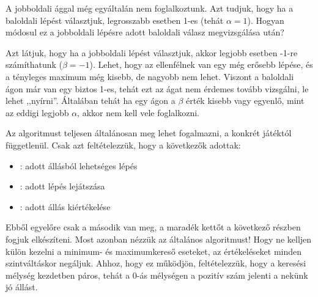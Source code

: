A jobboldali ággal még egyáltalán nem
foglalkoztunk. Azt tudjuk, hogy ha a baloldali
lépést választjuk, legrosszabb esetben 1-es (tehát
$\alpha=1$). Hogyan módosul ez a jobboldali lépésre
adott baloldali válasz megvizsgálása után?

\begin{center}
\end{center}

Azt látjuk, hogy ha a jobboldali lépést választjuk,
akkor legjobb esetben -1-re számíthatunk
($\beta=-1$). Lehet, hogy az ellenfélnek van egy még
erősebb lépése, és a tényleges maximum még kisebb,
de nagyobb nem lehet. Viszont a baloldali ágon már
van egy biztos 1-es, tehát ezt az ágat nem érdemes
tovább vizsgálni, le lehet ,,nyírni''. Általában
tehát ha egy ágon a $\beta$ érték kisebb vagy
egyenlő, mint az eddigi legjobb $\alpha$, akkor nem
kell vele foglalkozni.

Az algoritmust teljesen általánosan meg lehet
fogalmazni, a konkrét játéktól függetlenül. Csak azt
feltételezzük, hogy a következők adottak:
\begin{itemize}
\item {} : adott állásból
  lehetséges lépés
\item {} : adott lépés
  lejátszása
\item {} : adott állás
  kiértékelése
\end{itemize}

Ebből egyelőre csak a második van meg, a maradék
kettőt a következő részben fogjuk elkészíteni. Most
azonban nézzük az általános algoritmust! Hogy ne
kelljen külön kezelni a minimum- és maximumkereső
eseteket, az értékeléseket minden szintváltáskor
negáljuk. Ahhoz, hogy ez működjön, feltételezzük,
hogy a keresési mélység kezdetben páros, tehát a
0-ás mélységen a pozitív szám jelenti a nekünk jó
állást.

